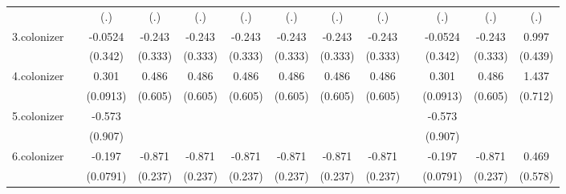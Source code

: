 {\begin{tabular}{l*{12}{c}}
            &                     &         (.)         &         (.)         &         (.)         &         (.)         &         (.)         &         (.)         &         (.)         &                     &         (.)         &         (.)         &         (.)         \\
[1em]
3.colonizer &                     &     -0.0524         &      -0.243         &      -0.243         &      -0.243         &      -0.243         &      -0.243         &      -0.243         &                     &     -0.0524         &      -0.243         &       0.997\sym{*}  \\
            &                     &     (0.342)         &     (0.333)         &     (0.333)         &     (0.333)         &     (0.333)         &     (0.333)         &     (0.333)         &                     &     (0.342)         &     (0.333)         &     (0.439)         \\
[1em]
4.colonizer &                     &       0.301\sym{**} &       0.486         &       0.486         &       0.486         &       0.486         &       0.486         &       0.486         &                     &       0.301\sym{**} &       0.486         &       1.437         \\
            &                     &    (0.0913)         &     (0.605)         &     (0.605)         &     (0.605)         &     (0.605)         &     (0.605)         &     (0.605)         &                     &    (0.0913)         &     (0.605)         &     (0.712)         \\
[1em]
5.colonizer &                     &      -0.573         &                     &                     &                     &                     &                     &                     &                     &      -0.573         &                     &                     \\
            &                     &     (0.907)         &                     &                     &                     &                     &                     &                     &                     &     (0.907)         &                     &                     \\
[1em]
6.colonizer &                     &      -0.197\sym{**} &      -0.871\sym{**} &      -0.871\sym{**} &      -0.871\sym{**} &      -0.871\sym{**} &      -0.871\sym{**} &      -0.871\sym{**} &                     &      -0.197\sym{**} &      -0.871\sym{**} &       0.469         \\
            &                     &    (0.0791)         &     (0.237)         &     (0.237)         &     (0.237)         &     (0.237)         &     (0.237)         &     (0.237)         &                     &    (0.0791)         &     (0.237)         &     (0.578)         \\

\end{tabular}}
